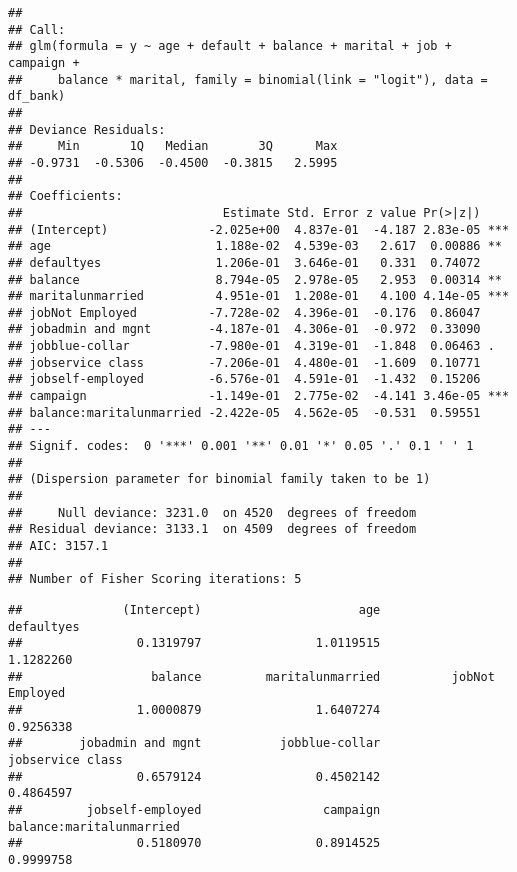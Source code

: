 \documentclass[
]{article}
\newenvironment{Shaded}{\begin{snugshade}}{\end{snugshade}}
\newcommand{\FunctionTok}[1]{\textcolor[rgb]{0.00,0.00,0.00}{#1}}
\newcommand{\NormalTok}[1]{#1}
\newcommand{\SpecialCharTok}[1]{\textcolor[rgb]{0.00,0.00,0.00}{#1}}
\begin{document}
\begin{verbatim}
## 
## Call:
## glm(formula = y ~ age + default + balance + marital + job + campaign + 
##     balance * marital, family = binomial(link = "logit"), data = df_bank)
## 
## Deviance Residuals: 
##     Min       1Q   Median       3Q      Max  
## -0.9731  -0.5306  -0.4500  -0.3815   2.5995  
## 
## Coefficients:
##                            Estimate Std. Error z value Pr(>|z|)    
## (Intercept)              -2.025e+00  4.837e-01  -4.187 2.83e-05 ***
## age                       1.188e-02  4.539e-03   2.617  0.00886 ** 
## defaultyes                1.206e-01  3.646e-01   0.331  0.74072    
## balance                   8.794e-05  2.978e-05   2.953  0.00314 ** 
## maritalunmarried          4.951e-01  1.208e-01   4.100 4.14e-05 ***
## jobNot Employed          -7.728e-02  4.396e-01  -0.176  0.86047    
## jobadmin and mgnt        -4.187e-01  4.306e-01  -0.972  0.33090    
## jobblue-collar           -7.980e-01  4.319e-01  -1.848  0.06463 .  
## jobservice class         -7.206e-01  4.480e-01  -1.609  0.10771    
## jobself-employed         -6.576e-01  4.591e-01  -1.432  0.15206    
## campaign                 -1.149e-01  2.775e-02  -4.141 3.46e-05 ***
## balance:maritalunmarried -2.422e-05  4.562e-05  -0.531  0.59551    
## ---
## Signif. codes:  0 '***' 0.001 '**' 0.01 '*' 0.05 '.' 0.1 ' ' 1
## 
## (Dispersion parameter for binomial family taken to be 1)
## 
##     Null deviance: 3231.0  on 4520  degrees of freedom
## Residual deviance: 3133.1  on 4509  degrees of freedom
## AIC: 3157.1
## 
## Number of Fisher Scoring iterations: 5
\end{verbatim}

\begin{Shaded}
\end{Shaded}

\begin{verbatim}
##              (Intercept)                      age               defaultyes 
##                0.1319797                1.0119515                1.1282260 
##                  balance         maritalunmarried          jobNot Employed 
##                1.0000879                1.6407274                0.9256338 
##        jobadmin and mgnt           jobblue-collar         jobservice class 
##                0.6579124                0.4502142                0.4864597 
##         jobself-employed                 campaign balance:maritalunmarried 
##                0.5180970                0.8914525                0.9999758
\end{verbatim}
\end{document}
